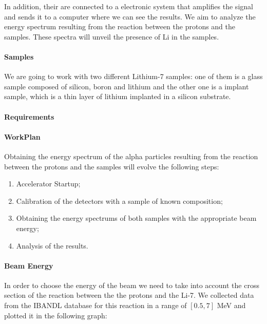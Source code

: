\documentclass{article}
\begin{document}
\begin{multicols}{2}
In addition, their are connected to a electronic system that amplifies the signal and sends it to a computer where we
can see the results.
We aim to analyze the energy spectrum resulting from the reaction between the protons and the samples.
These spectra will unveil the presence of Li in the samples.

\paragraph{Samples}

We are going to work with two different Lithium-7 samples: one of them is a glass sample composed of silicon, boron and
lithium and the other one is a implant sample, which is a thin layer of lithium implanted in a silicon substrate.

\paragraph{Requirements}


\paragraph{WorkPlan}

Obtaining the energy spectrum of the alpha particles resulting from the reaction between the protons and the samples will
evolve the following steps:

\begin{enumerate}
  \item Accelerator Startup;
  \item Calibration of the detectors with a sample of known composition;
  \item Obtaining the energy spectrums of both samples with the appropriate beam energy;
  \item Analysis of the results.
\end{enumerate}

\paragraph*{Beam Energy}

In order to choose the energy of the beam we need to take into account the cross section of the reaction between the the protons and the Li-7.
We collected data from the IBANDL \cite{IAEA_EXFOR} database for this reaction in a range of $[0.5,7]$ MeV and plotted it in the following graph:


\end{multicols}
\end{document}
